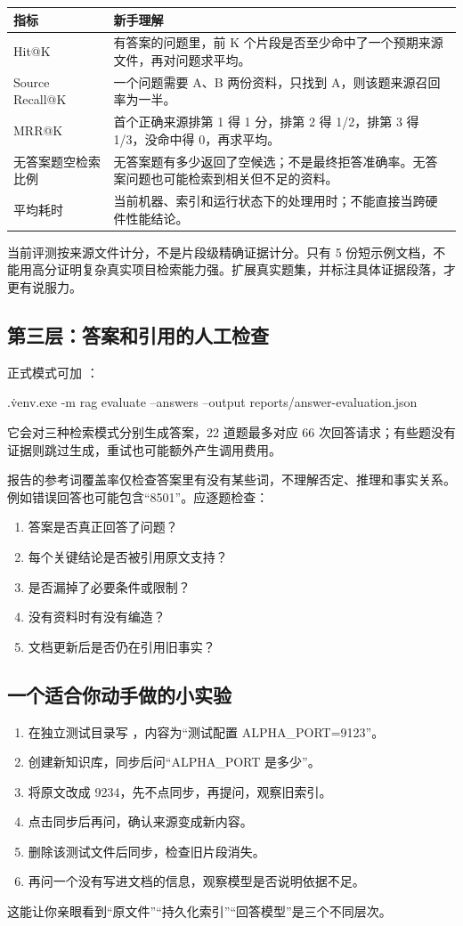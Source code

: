 \documentclass[UTF8,11pt,a4paper,fontset=fandol]{ctexart}
\newcommand{\code}[1]{\texttt{\detokenize{#1}}}
\begin{document}
\begin{longtable}{L{0.28\textwidth}L{0.60\textwidth}}
\toprule
指标 & 新手理解 \\
\midrule
Hit@K & 有答案的问题里，前 K 个片段是否至少命中了一个预期来源文件，再对问题求平均。 \\
Source Recall@K & 一个问题需要 A、B 两份资料，只找到 A，则该题来源召回率为一半。 \\
MRR@K & 首个正确来源排第 1 得 1 分，排第 2 得 1/2，排第 3 得 1/3，没命中得 0，再求平均。 \\
无答案题空检索比例 & 无答案题有多少返回了空候选；不是最终拒答准确率。无答案问题也可能检索到相关但不足的资料。 \\
平均耗时 & 当前机器、索引和运行状态下的处理用时；不能直接当跨硬件性能结论。 \\
\bottomrule
\end{longtable}
当前评测按来源文件计分，不是片段级精确证据计分。只有 5 份短示例文档，不能用高分证明复杂真实项目检索能力强。扩展真实题集，并标注具体证据段落，才更有说服力。

\subsection{第三层：答案和引用的人工检查}
正式模式可加 \code{--answers}：
\begin{Code}
.\.venv\Scripts\python.exe -m rag evaluate --answers --output reports/answer-evaluation.json
\end{Code}
它会对三种检索模式分别生成答案，22 道题最多对应 66 次回答请求；有些题没有证据则跳过生成，重试也可能额外产生调用费用。

报告的参考词覆盖率仅检查答案里有没有某些词，不理解否定、推理和事实关系。例如错误回答也可能包含“8501”。应逐题检查：
\begin{enumerate}
\item 答案是否真正回答了问题？
\item 每个关键结论是否被引用原文支持？
\item 是否漏掉了必要条件或限制？
\item 没有资料时有没有编造？
\item 文档更新后是否仍在引用旧事实？
\end{enumerate}

\subsection{一个适合你动手做的小实验}
\begin{enumerate}
\item 在独立测试目录写 \code{note.md}，内容为“测试配置 ALPHA\_PORT=9123”。
\item 创建新知识库，同步后问“ALPHA\_PORT 是多少”。
\item 将原文改成 9234，先不点同步，再提问，观察旧索引。
\item 点击同步后再问，确认来源变成新内容。
\item 删除该测试文件后同步，检查旧片段消失。
\item 再问一个没有写进文档的信息，观察模型是否说明依据不足。
\end{enumerate}
这能让你亲眼看到“原文件”“持久化索引”“回答模型”是三个不同层次。
\end{document}
